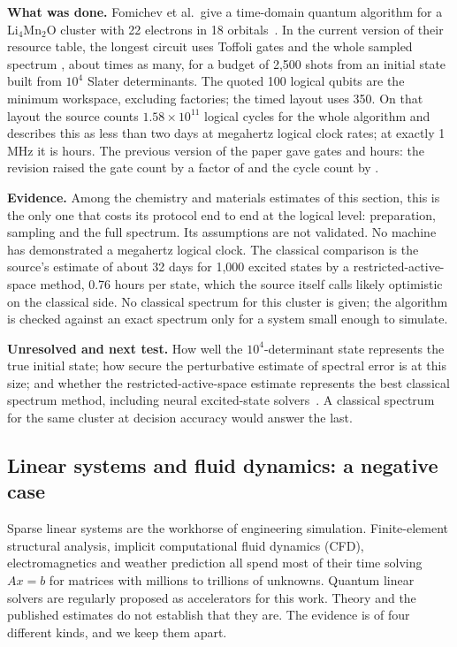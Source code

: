 \textbf{What was done.} Fomichev et al.\ give a time-domain quantum algorithm for a Li$_4$Mn$_2$O cluster with 22 electrons in 18 orbitals~\cite{fomichev2025}. In the current version of their resource table, the longest circuit uses \xasCirc{} Toffoli gates and the whole sampled spectrum \xasAlg{}, about \xasCircuits{} times as many, for a budget of 2{,}500 shots from an initial state built from $10^4$ Slater determinants. The quoted 100 logical qubits are the minimum workspace, excluding factories; the timed layout uses 350. On that layout the source counts $1.58\times10^{11}$ logical cycles for the whole algorithm and describes this as less than two days at megahertz logical clock rates; at exactly 1\,MHz it is \xasHours{} hours. The previous version of the paper gave \xasAlgOld{} gates and \xasHoursOld{} hours: the revision raised the gate count by a factor of \xasGateRatio{} and the cycle count by \xasCycleRatio.

\textbf{Evidence.} Among the chemistry and materials estimates of this section, this is the only one that costs its protocol end to end at the logical level: preparation, sampling and the full spectrum. Its assumptions are not validated. No machine has demonstrated a megahertz logical clock. The classical comparison is the source's estimate of about 32 days for 1{,}000 excited states by a restricted-active-space method, 0.76 hours per state, which the source itself calls likely optimistic on the classical side. No classical spectrum for this cluster is given; the algorithm is checked against an exact spectrum only for a system small enough to simulate.

\textbf{Unresolved and next test.} How well the $10^4$-determinant state represents the true initial state; how secure the perturbative estimate of spectral error is at this size; and whether the restricted-active-space estimate represents the best classical spectrum method, including neural excited-state solvers~\cite{pfau2024}. A classical spectrum for the same cluster at decision accuracy would answer the last.

\subsection{Linear systems and fluid dynamics: a negative case}
\label{sec:linear}
Sparse linear systems are the workhorse of engineering simulation. Finite-element structural analysis, implicit computational fluid dynamics (CFD), electromagnetics and weather prediction all spend most of their time solving $Ax=b$ for matrices with millions to trillions of unknowns. Quantum linear solvers are regularly proposed as accelerators for this work. Theory and the published estimates do not establish that they are. The evidence is of four different kinds, and we keep them apart.

